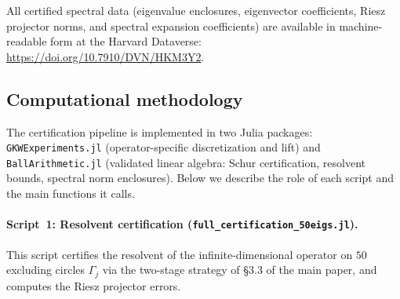 \documentclass[11pt]{article}
\begin{document}
All certified spectral data (eigenvalue enclosures, eigenvector coefficients,
Riesz projector norms, and spectral expansion coefficients) are available in
machine-readable form at the Harvard Dataverse:
\url{https://doi.org/10.7910/DVN/HKM3Y2}.

\subsection*{Computational methodology}

The certification pipeline is implemented in two Julia packages:
\texttt{GKWExperiments.jl} (operator-specific discretization and lift)
and \texttt{BallArithmetic.jl} (validated linear algebra: Schur certification,
resolvent bounds, spectral norm enclosures).
Below we describe the role of each script and the main functions it calls.

\paragraph{Script~1: Resolvent certification (\texttt{full\_certification\_50eigs.jl}).}
This script certifies the resolvent of the infinite-dimensional operator
on $50$ excluding circles $\Gamma_j$ via the two-stage strategy
of \S3.3 of the main paper, and computes the Riesz projector errors.
\end{document}
